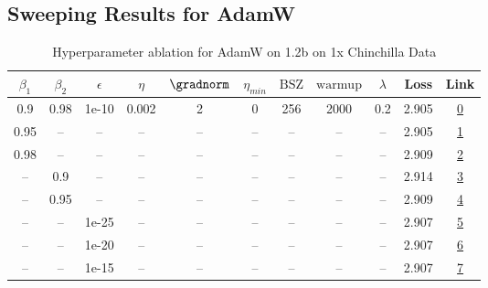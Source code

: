 \subsection{Sweeping Results for AdamW}%
\begin{table}[H]
\centering
\caption{Hyperparameter ablation for AdamW on 1.2b on 1x Chinchilla Data}
\label{tab:ablation_adamw_1.2b_on_1x_chinchilla_data}
\begin{tabular}{ccccccccccc}
\toprule
$\beta_1$ & $\beta_2$ & $\epsilon$ & $\eta$ & $\gradnorm$ & $\eta_{min}$ & $\mathrm{BSZ}$ & $\mathrm{warmup}$ & $\lambda$ & Loss & Link \\
\midrule
0.9 & 0.98 & 1e-10 & 0.002 & 2 & 0 & 256 & 2000 & 0.2 & 2.905 & \href{https://wandb.ai/stanford-mercury/optimizer-scaling/runs/sweep-1.2b-24B-adamwf115b7lr0.002-wd0.2-minlr0-warmup2000-b10.9--387e9f}{0} \\
\midrule
0.95 & -- & -- & -- & -- & -- & -- & -- & -- & 2.905 & \href{https://wandb.ai/stanford-mercury/optimizer-scaling/runs/sweep-1.2b-24B-adamwf17f49lr0.002-wd0.2-minlr0-warmup2000-b10.95-444ce8}{1} \\
0.98 & -- & -- & -- & -- & -- & -- & -- & -- & 2.909 & \href{https://wandb.ai/stanford-mercury/optimizer-scaling/runs/sweep-1.2b-24B-adamwcce254flr0.002-wd0.2-minlr0-warmup2000-b10.9-744305}{2} \\
-- & 0.9 & -- & -- & -- & -- & -- & -- & -- & 2.914 & \href{https://wandb.ai/stanford-mercury/optimizer-scaling/runs/sweep-1.2b-24B-adamwf7d5fdlr0.002-wd0.2-minlr0-warmup2000-b10.9--2217ed}{3} \\
-- & 0.95 & -- & -- & -- & -- & -- & -- & -- & 2.909 & \href{https://wandb.ai/stanford-mercury/optimizer-scaling/runs/sweep-1.2b-24B-adamwa250dblr0.002-wd0.2-minlr0-warmup2000-b10.9--91a988}{4} \\
-- & -- & 1e-25 & -- & -- & -- & -- & -- & -- & 2.907 & \href{https://wandb.ai/stanford-mercury/optimizer-scaling/runs/sweep-1.2b-24B-adamwfb226elr0.002-wd0.2-minlr0-warmup2000-b10.9--56cdf6}{5} \\
-- & -- & 1e-20 & -- & -- & -- & -- & -- & -- & 2.907 & \href{https://wandb.ai/stanford-mercury/optimizer-scaling/runs/sweep-1.2b-24B-adamw269849lr0.002-wd0.2-minlr0-warmup2000-b10.9--f1a022}{6} \\
-- & -- & 1e-15 & -- & -- & -- & -- & -- & -- & 2.907 & \href{https://wandb.ai/stanford-mercury/optimizer-scaling/runs/sweep-1.2b-24B-adamwb9e3belr0.002-wd0.2-minlr0-warmup2000-b10.9--3d8fda}{7} \\

\end{tabular}
\end{table}
